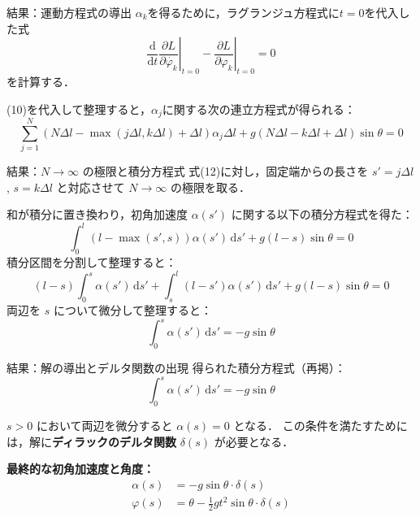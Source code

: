 \documentclass[11pt, unicode, aspectratio=169]{beamer}
\begin{document}
\begin{frame}{結果：運動方程式の導出}
  $\alpha_k$を得るために，ラグランジュ方程式に$t = 0$を代入した式
  \begin{equation}
    \left.\frac{\mathrm{d}}{\mathrm{d}t} \frac{\partial L}{\partial \dot{\varphi_k}}\right|_{t = 0}
    - \left.\frac{\partial L}{\partial \varphi_k}\right|_{t = 0} = 0
  \end{equation}
  を計算する．
  \vspace{1em}

  (10)を代入して整理すると，$\alpha_j$に関する次の連立方程式が得られる：
  \begin{equation}
    \sum_{j = 1}^{N} \left(N \Delta l
    - \max \left(j \Delta l, k \Delta l\right) + \Delta l\right) \alpha_j
    \Delta l + g \left(N \Delta l - k \Delta l + \Delta l\right) \sin \theta = 0
  \end{equation}
  
\end{frame}

\begin{frame}{結果：$N \rightarrow \infty$ の極限と積分方程式}
  式(12)に対し，固定端からの長さを $s' = j \Delta l$ , $s = k \Delta l$ と対応させて $N \rightarrow \infty$ の極限を取る．
  \vspace{1em}
  
  和が積分に置き換わり，初角加速度 $\alpha(s')$ に関する以下の積分方程式を得た：
  \begin{equation}
    \int_{0}^{l} \left(l - \max(s', s)\right) \alpha(s') \,\mathrm{d}s' + g(l - s)\sin\theta = 0
  \end{equation}
  積分区間を分割して整理すると：
  \begin{equation}
    \left(l - s\right) \int_{0}^{s} \alpha\left(s'\right) \,\mathrm{d}s'
    + \int_{s}^{l} \left(l - s'\right) \alpha\left(s'\right) \,\mathrm{d}s'
    + g \left(l - s\right) \sin \theta = 0
  \end{equation}
  両辺を $s$ について微分して整理すると：
  \begin{equation}
    \int_{0}^{s} \alpha(s') \,\mathrm{d}s' = -g \sin\theta
  \end{equation}
\end{frame}

\begin{frame}{結果：解の導出とデルタ関数の出現}
  得られた積分方程式（再掲）：
  $$ \int_{0}^{s} \alpha(s') \,\mathrm{d}s' = -g \sin\theta $$
  
  \vspace{1em}
  $s > 0$ において両辺を微分すると $\alpha(s) = 0$ となる．
  この条件を満たすためには，解に\textbf{ディラックのデルタ関数} $\delta(s)$ が必要となる．

  \vspace{1em}
  \textbf{最終的な初角加速度と角度：}
  \begin{align}
    \alpha(s) &= -g \sin\theta \cdot \delta(s) \\
    \varphi(s) &= \theta - \frac{1}{2}gt^2 \sin\theta \cdot \delta(s)
  \end{align}
\end{frame}
\end{document}

